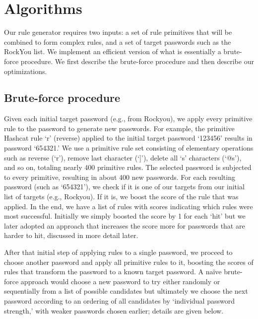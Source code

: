 \documentclass{article}
\begin{document}


\section{Algorithms}
\label{sec:algorithm}

Our rule generator requires two inputs: a set of rule primitives that will be
combined to form complex rules, and a set of target passwords such as the
RockYou list. We implement an efficient version of what is essentially a
brute-force procedure. We first describe the brute-force procedure and then
describe our optimizations.


\subsection{Brute-force procedure}

Given each initial target password (e.g., from Rockyou), we apply every
primitive rule to the password to generate new passwords. For example, the
primitive Hashcat rule `r' (reverse) applied to the initial target password
`123456' results in password `654321.' We use a primitive rule set consisting
of elementary operations such as reverse (`r'), remove last character (`]'),
delete all `s' characters (`@s'), and so on, totaling nearly 400 primitive
rules. The selected password is subjected to every primitive, resulting in about
400 new passwords. For each resulting password (such as `654321'), we check if
it is one of our targets from our initial list of targets (e.g., Rockyou). If it
is, we boost the score of the rule that was applied. In the end, we have a list
of rules with scores indicating which rules were most successful. Initially
we simply boosted the score by 1 for each `hit' but we later adopted an
approach that increases the score more for passwords that are harder to hit,
discussed in more detail later.

After that initial step of applying rules to a single password, we proceed to
choose another password and apply all primitive rules to it, boosting the
scores of rules that transform the password to a known target password. A
naïve brute-force approach would choose a new password to try either randomly
or sequentially from a list of possible candidates but ultimately we
choose the next password according to an ordering of all candidates by
`individual password strength,' with weaker passwords chosen earlier; details
are given below.
\end{document}
